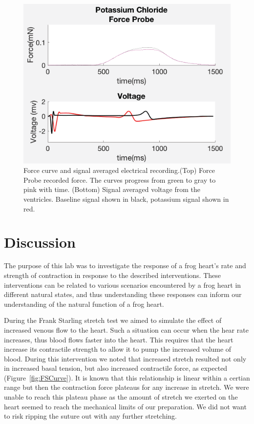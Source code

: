 \documentclass[12pt]{article}
\begin{document}
\begin{figure}[H]
	\label{fig:KCL}
	\centering
	\includegraphics[width = .95\textwidth]{Figures/KCl.png}
	\caption{Force curve and signal averaged electrical recording.(Top) Force Probe recorded force. The curves progress from green to gray to pink with time. (Bottom) Signal averaged voltage from the ventricles. Baseline signal shown in black, potassium signal shown in red. }
\end{figure}
\section{Discussion}
\par{}
The purpose of this lab was to investigate the response of a frog heart's rate and strength of contraction in response to the described interventions. These interventions can be related to various scenarios encountered by a frog heart in different natural states, and thus understanding these responses can inform our understanding of the natural function of a frog heart. 

\par{}
During the Frank Starling stretch test we aimed to simulate the effect of increased venous flow to the heart. Such a situation can occur when the hear rate increases, thus blood flows faster into the heart. This requires that the heart increase its contractile strength to allow it to pump the increased volume of blood. During this intervention we noted that increased stretch resulted not only in increased basal tension, but also increased contractile force, as expected (Figure~\ref{fig:FSCurve}). It is known that this relationship is linear within a certian range but then the contraction force plateaus for any increase in stretch. We were unable to reach this plateau phase as the amount of stretch we exerted on the heart seemed to reach the mechanical limits of our preparation. We did not want to risk ripping the suture out with any further stretching.
\end{document}
